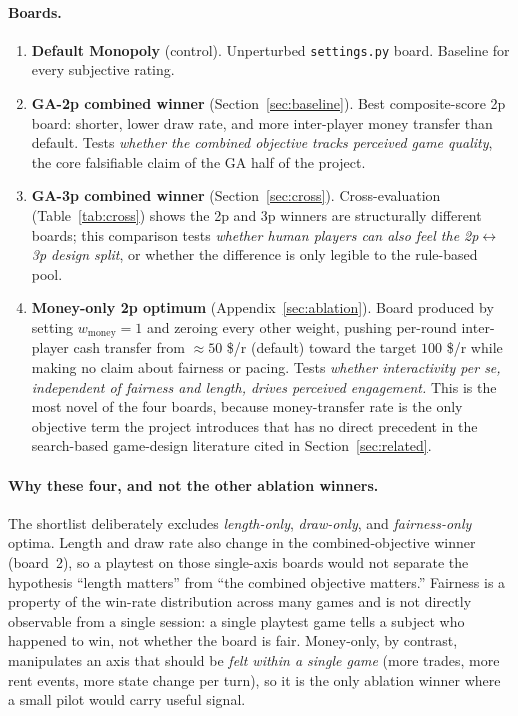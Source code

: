 \documentclass[10pt]{article}
\begin{document}
\paragraph{Boards.}
\begin{enumerate}[leftmargin=1.4em,itemsep=2pt]
  \item \textbf{Default Monopoly} (control). Unperturbed
    \texttt{settings.py} board. Baseline for every subjective
    rating.
  \item \textbf{GA-2p combined winner} (Section~\ref{sec:baseline}).
    Best composite-score 2p board: shorter, lower draw rate, and
    more inter-player money transfer than default. Tests
    \emph{whether the combined objective tracks perceived game
    quality}, the core falsifiable claim of the GA half of the
    project.
  \item \textbf{GA-3p combined winner} (Section~\ref{sec:cross}).
    Cross-evaluation (Table~\ref{tab:cross}) shows the 2p and 3p
    winners are structurally different boards; this comparison
    tests \emph{whether human players can also feel the
    2p$\!\leftrightarrow\!$3p design split}, or whether the
    difference is only legible to the rule-based pool.
  \item \textbf{Money-only 2p optimum}
    (Appendix~\ref{sec:ablation}). Board produced by setting
    $w_{\text{money}}{=}1$ and zeroing every other weight,
    pushing per-round inter-player cash transfer from
    $\approx 50$ \$/r (default) toward the target $100$ \$/r
    while making no claim about fairness or pacing. Tests
    \emph{whether interactivity \emph{per se}, independent of
    fairness and length, drives perceived engagement.} This is
    the most novel of the four boards, because money-transfer
    rate is the only objective term the project introduces that
    has no direct precedent in the search-based game-design
    literature cited in Section~\ref{sec:related}.
\end{enumerate}

\paragraph{Why these four, and not the other ablation winners.}
The shortlist deliberately excludes \emph{length-only},
\emph{draw-only}, and \emph{fairness-only} optima. Length and
draw rate also change in the combined-objective winner (board~2),
so a playtest on those single-axis boards would not separate the
hypothesis ``length matters'' from ``the combined objective
matters.'' Fairness is a property of the win-rate distribution
across many games and is not directly observable from a single
session: a single playtest game tells a subject who happened to
win, not whether the board is fair. Money-only, by contrast,
manipulates an axis that should be \emph{felt within a single
game} (more trades, more rent events, more state change per
turn), so it is the only ablation winner where a small pilot
would carry useful signal.
\end{document}
